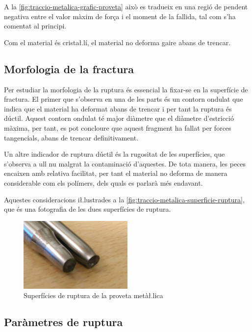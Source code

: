 \documentclass[a4paper]{report}
\begin{document}
A la \autoref{fig:traccio-metalica-grafic-proveta} això es tradueix en una regió de pendent negativa entre el valor màxim de força i el moment de la fallida, tal com s’ha comentat al principi.

Com el material és crista\l.lí, el material no deforma gaire abans de trencar.

\subsection{Morfologia de la fractura}
Per estudiar la morfologia de la ruptura és essencial la fixar-se en la superfície de fractura. El primer que s’observa en una de les parts és un contorn ondulat que indica que el material ha deformat abans de trencar i per tant la ruptura és dúctil. Aquest contorn ondulat té major diàmetre que el diàmetre d’estricció màxima, per tant, es pot concloure que aquest fragment ha fallat per forces tangencials, abans de trencar definitivament.

Un altre indicador de ruptura dúctil és la rugositat de les superfícies, que s’observa a ull nu malgrat la contaminació d’aquestes. De tota manera, les peces encaixen amb relativa facilitat, per tant el material no deforma de manera considerable com els polímers, dels quals es parlarà més endavant.

Aquestes consideracions i\l.lustrades a la \autoref{fig:traccio-metalica-superficie-ruptura}, que és una fotografia de les dues superfícies de ruptura. 

\begin{figure}[ht]
    \centering
    \includegraphics[width=0.5\textwidth]{images/traccio/metalica-superficie-ruptura}
    \caption{Superfícies de ruptura de la proveta metà\l.lica}
    \label{fig:traccio-metalica-superficie-ruptura}
\end{figure}

\subsection{Paràmetres de ruptura}
\end{document}
